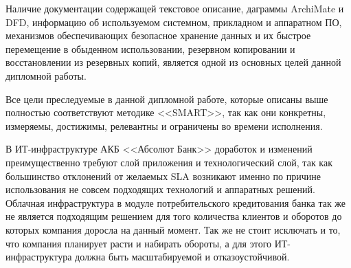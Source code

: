 \documentclass[14pt, a4paper]{extarticle}
\begin{document}
Наличие документации содержащей текстовое описание, даграммы ArchiMate и DFD,
информацию об используемом системном, прикладном и аппаратном ПО, механизмов
обеспечивающих безопасное хранение данных и их быстрое перемещение в обыденном
использовании, резервном копировании и восстановлении из резервных копий,
является одной из основных целей данной дипломной работы. 

Все цели преследуемые в данной дипломной работе, которые описаны выше полностью
соответствуют методике <<SMART>>, так как они конкретны, измеряемы, достижимы,
релевантны и ограничены во времени исполнения.

В ИТ-инфраструктуре АКБ <<Абсолют Банк>> доработок и изменений преимущественно
требуют слой приложения и технологический слой, так как большинство отклонений
от желаемых SLA возникают именно по причине использования не совсем подходящих
технологий и аппаратных решений. Облачная инфраструктура в модуле
потребительского кредитования банка так же не является подходящим решением для
того количества клиентов и оборотов до которых компания доросла на данный
момент. Так же не стоит исключать и то, что компания планирует расти и набирать
обороты, а для этого ИТ-инфраструктура должна быть масштабируемой и
отказоустойчивой.

\begingroup
	\let\itshape\upshape
	\sloppy
	\raggedright
	\printbibliography[title=СПИСОК ИСПОЛЬЗУЕМЫХ ИСТОЧНИКОВ]
\endgroup
\end{document}
